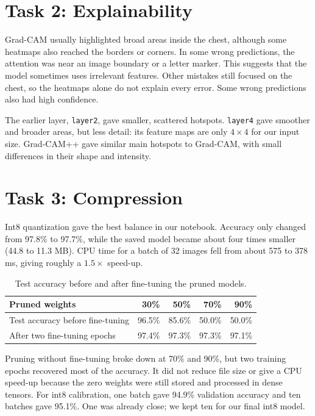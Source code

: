 \documentclass[11pt,a4paper]{article}
\begin{document}
\section{Task 2: Explainability}
Grad-CAM usually highlighted broad areas inside the chest, although some
heatmaps also reached the borders or corners. In some wrong predictions, the
attention was near an image boundary or a letter marker. This suggests that
the model sometimes uses irrelevant features. Other mistakes still focused
on the chest, so the heatmaps alone do not explain every error. Some wrong
predictions also had high confidence.

The earlier layer, \texttt{layer2}, gave smaller, scattered hotspots.
\texttt{layer4} gave smoother and broader areas, but less detail: its feature
maps are only $4\times4$ for our input size. Grad-CAM++ gave similar main
hotspots to Grad-CAM, with small differences in their shape and intensity.

\section{Task 3: Compression}
Int8 quantization gave the best balance in our notebook. Accuracy only changed
from 97.8\% to 97.7\%, while the saved model became about four times smaller
(44.8 to 11.3 MB). CPU time for a batch of 32 images fell from about 575 to
378 ms, giving roughly a $1.5\times$ speed-up.

\begin{table}[ht]
\centering
\small
\caption{Test accuracy before and after fine-tuning the pruned models.}
\begin{tabular}{lrrrr}
\toprule
Pruned weights & 30\% & 50\% & 70\% & 90\%\\
\midrule
Test accuracy before fine-tuning & 96.5\% & 85.6\% & 50.0\% & 50.0\%\\
After two fine-tuning epochs & 97.4\% & 97.3\% & 97.3\% & 97.1\%\\
\bottomrule
\end{tabular}
\end{table}

Pruning without fine-tuning broke down at 70\% and 90\%, but two training
epochs recovered most of the accuracy. It did not reduce file size or give a
CPU speed-up because the zero weights were still stored and processed in
dense tensors. For int8 calibration, one batch gave 94.9\% validation accuracy
and ten batches gave 95.1\%. One was already close; we kept ten for our final
int8 model.
\end{document}
